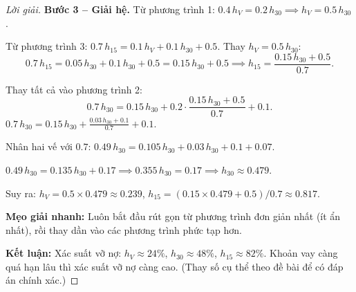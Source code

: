 \documentclass[8pt,a4paper]{article}
\newenvironment{solution}{\begin{proof}[Lời giải]}{\end{proof}}
\begin{document}
\begin{solution}
\textbf{Bước 3 -- Giải hệ.}
Từ phương trình 1: $0.4\, h_V = 0.2\, h_{30} \implies h_V = 0.5\, h_{30}$.

Từ phương trình 3: $0.7\, h_{15} = 0.1\, h_V + 0.1\, h_{30} + 0.5$. Thay $h_V = 0.5\, h_{30}$:
\[
  0.7\, h_{15} = 0.05\, h_{30} + 0.1\, h_{30} + 0.5 = 0.15\, h_{30} + 0.5 \implies h_{15} = \frac{0.15\, h_{30} + 0.5}{0.7}.
\]

Thay tất cả vào phương trình 2:
\[
  0.7\, h_{30} = 0.15\, h_{30} + 0.2 \cdot \frac{0.15\, h_{30} + 0.5}{0.7} + 0.1.
\]
$0.7\, h_{30} = 0.15\, h_{30} + \frac{0.03\, h_{30} + 0.1}{0.7} + 0.1$.

Nhân hai vế với $0.7$: $0.49\, h_{30} = 0.105\, h_{30} + 0.03\, h_{30} + 0.1 + 0.07$.

$0.49\, h_{30} = 0.135\, h_{30} + 0.17 \implies 0.355\, h_{30} = 0.17 \implies h_{30} \approx 0.479$.

Suy ra: $h_V = 0.5 \times 0.479 \approx 0.239$, $h_{15} = (0.15 \times 0.479 + 0.5)/0.7 \approx 0.817$.

\textbf{Mẹo giải nhanh:} Luôn bắt đầu rút gọn từ phương trình đơn giản nhất (ít ẩn nhất), rồi thay dần vào các phương trình phức tạp hơn.

\textbf{Kết luận:} Xác suất vỡ nợ: $h_V \approx 24\%$, $h_{30} \approx 48\%$, $h_{15} \approx 82\%$. Khoản vay càng quá hạn lâu thì xác suất vỡ nợ càng cao. (Thay số cụ thể theo đề bài để có đáp án chính xác.)
\end{solution}
\end{document}
